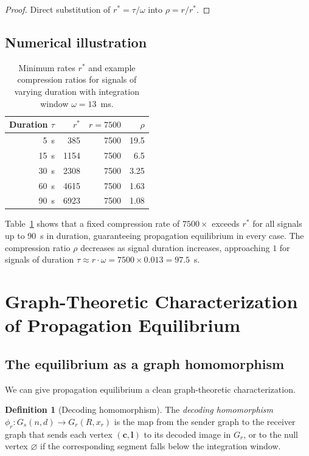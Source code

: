 \documentclass[twocolumn,11pt,a4paper]{article}
\theoremstyle{main}
\theoremstyle{definition}
\newtheorem{definition}[theorem]{Definition}
\theoremstyle{remark}
\newcommand{\Recv}{R}
\newcommand{\rate}{r}
\newcommand{\window}{\omega}
\begin{document}
\begin{proof}
Direct substitution of $\rate^* = \tau/\window$ into
$\rho = \rate/\rate^*$.
\end{proof}

\subsection{Numerical illustration}

\begin{table}[h]
\centering
\caption{Minimum rates $\rate^*$ and example compression ratios for
signals of varying duration with integration window $\window = 13$~ms.}
\label{tab:rates}
\begin{tabular}{@{}rrrr@{}}
\toprule
Duration $\tau$ & $\rate^*$ & $\rate = 7500$ & $\rho$ \\
\midrule
5~s   &  385  & 7500 & 19.5 \\
15~s  & 1154  & 7500 &  6.5 \\
30~s  & 2308  & 7500 &  3.25 \\
60~s  & 4615  & 7500 &  1.63 \\
90~s  & 6923  & 7500 &  1.08 \\
\bottomrule
\end{tabular}
\end{table}

Table~\ref{tab:rates} shows that a fixed compression rate of $7500\times$
exceeds $\rate^*$ for all signals up to 90~s in duration, guaranteeing
propagation equilibrium in every case. The compression ratio $\rho$
decreases as signal duration increases, approaching $1$ for signals of
duration $\tau \approx \rate \cdot \window = 7500 \times 0.013 = 97.5$~s.

\section{Graph-Theoretic Characterization of Propagation Equilibrium}
\label{sec:graph}

\subsection{The equilibrium as a graph homomorphism}

We can give propagation equilibrium a clean graph-theoretic
characterization.

\begin{definition}[Decoding homomorphism]
\label{def:homomorphism}
The \emph{decoding homomorphism} $\phi_\rate : G_s(n,d) \to G_r(\Recv,
x_\rate)$ is the map from the sender graph to the receiver graph that
sends each vertex $(\mathbf{c}, \mathbf{l})$ to its decoded image in
$G_r$, or to the null vertex $\varnothing$ if the corresponding segment
falls below the integration window.
\end{definition}
\end{document}
